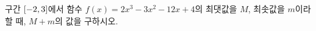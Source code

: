 구간 $[-2{,}\mkern3mu\mathopen{}3]$에서 함수 $f(x)=2x^3-3x^2-12x+4$의 최댓값을 $M$, 최솟값을 $m$이라 할 때, $M+m$의 값을 구하시오.
